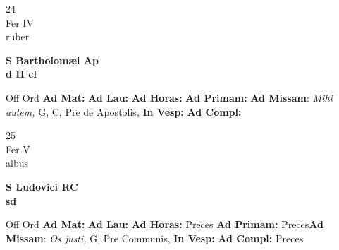 \documentclass[10pt, openany]{book}
\begin{document}
    \begin{center}
        \begin{minipage}{3.5in}
            \vspace{2em}
            \begin{minipage}{0.5in}
                {\Huge 24} \\
                {\normalsize Fer IV} \\
                {\normalsize ruber}
            \end{minipage}
            \begin{minipage}{3.0in}
                \textbf{ \large S Bartholomæi Ap \\
                \textnormal{\normalsize d II cl}} \\ 
            \end{minipage}
            \begin{justify}Off Ord
                \textbf{Ad Mat: }
                \textbf{Ad Lau: }
                \textbf{Ad Horas: }
                \textbf{Ad Primam: }\textbf{Ad Missam}: \textit{Mihi autem,} G, C, Pre de Apostolis,  
                \textbf{In Vesp: }
                \textbf{Ad Compl: }
            \end{justify}
        \end{minipage}
    \end{center}

    \begin{center}
        \begin{minipage}{3.5in}
            \vspace{2em}
            \begin{minipage}{0.5in}
                {\Huge 25} \\
                {\normalsize Fer V} \\
                {\normalsize albus}
            \end{minipage}
            \begin{minipage}{3.0in}
                \textbf{ \large S Ludovici RC \\
                \textnormal{\normalsize sd}} \\ 
            \end{minipage}
            \begin{justify}Off Ord
                \textbf{Ad Mat: }
                \textbf{Ad Lau: }
                \textbf{Ad Horas: }Preces
                \textbf{Ad Primam: }Preces\textbf{Ad Missam}: \textit{Os justi,} G, Pre Communis,  
                \textbf{In Vesp: }
                \textbf{Ad Compl: }Preces
            \end{justify}
        \end{minipage}
    \end{center}
\end{document}
